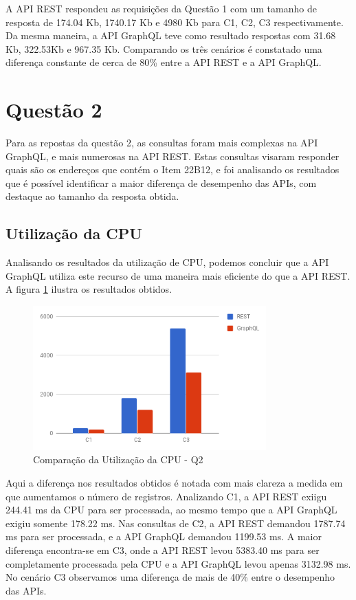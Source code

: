 A API REST respondeu as requisições da Questão 1 com um tamanho de resposta de 174.04 Kb, 1740.17 Kb e 4980 Kb para C1, C2, C3 respectivamente. Da mesma maneira, a API GraphQL teve como resultado respostas com 31.68 Kb, 322.53Kb e 967.35 Kb. Comparando os três cenários é constatado uma diferença constante de cerca de 80\% entre a API REST e a API GraphQL.


\section{Questão 2}

Para as repostas da questão 2, as consultas foram mais complexas na API GraphQL, e mais numerosas na API REST. Estas consultas visaram responder quais são os endereços que contém o Item 22B12, e foi analisando os resultados que é possível identificar a maior diferença de desempenho das APIs, com destaque ao tamanho da resposta obtida.

\subsection{Utilização da CPU}

Analisando os resultados da utilização de CPU, podemos concluir que a API GraphQL utiliza este recurso de uma maneira mais eficiente do que a API REST. A figura \ref{fig:q2-cpu} ilustra os resultados obtidos.

\begin{figure}[htbp]
    \centering
    \includegraphics[width=0.8\textwidth]{figuras/q2-cpu.png}
    \caption{Comparação da Utilização da CPU - Q2}
    \label{fig:q2-cpu}
    \author{fonte: Autor}
\end{figure}

Aqui a diferença nos resultados obtidos é notada com mais clareza a medida em que aumentamos o número de registros. Analizando C1, a API REST exiigu 244.41 ms da CPU para ser processada, ao mesmo tempo que a API GraphQL exigiu somente 178.22 ms. Nas consultas de C2, a API REST demandou 1787.74 ms para ser processada, e a API GraphQL demandou 1199.53 ms. A maior diferença encontra-se em C3, onde a API REST levou 5383.40 ms para ser completamente processada pela CPU e a API GraphQL levou apenas 3132.98 ms. No cenário C3 observamos uma diferença de mais de 40\% entre o desempenho das APIs.

